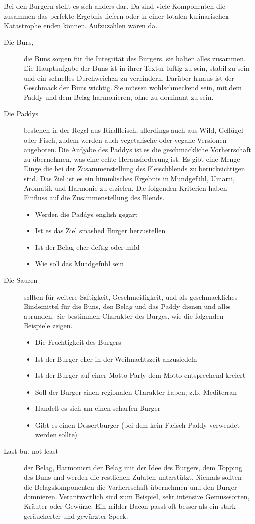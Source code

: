Bei den Burgern stellt es sich anders dar. Da sind viele Komponenten die zusammen das perfekte Ergebnis liefern oder in einer totalen 
kulinarischen Katastrophe enden können.  Aufzuzählen wären da.
\begin{description}
	\item [Die Buns,] die Buns sorgen für die Integrität des Burgers, sie halten alles zusammen. Die Hauptaufgabe der Buns ist in ihrer Textur 
	luftig zu sein, stabil zu sein und ein schnelles Durchweichen zu verhindern. Darüber hinaus ist der Geschmack der Buns wichtig. Sie müssen 
	wohlschmeckend sein, mit dem Paddy und dem Belag harmonieren, ohne zu dominant zu sein.
	\item[Die Paddys] bestehen in der Regel aus Rindfleisch, allerdings auch aus Wild, Geflügel oder Fisch, zudem werden auch vegetarische 
	oder vegane Versionen angeboten. Die Aufgabe des Paddys ist es die geschmackliche Vorherrschaft zu übernehmen, was eine echte 
	Herausforderung ist. Es gibt eine Menge Dinge die bei der Zusammenstellung des Fleischblends zu berücksichtigen sind. Das Ziel ist es ein 
	himmlisches Ergebnis in Mundgefühl, Umami, Aromatik und Harmonie zu erzielen. 
	Die folgenden Kriterien haben Einfluss auf die Zusammenstellung des Blends.
	
		\begin{itemize}[noitemsep]
			\item Werden die Paddys english gegart
			\item Ist es das Ziel smashed Burger herzustellen
			\item Ist der Belag eher deftig oder mild
			\item Wie soll das Mundgefühl sein
		\end{itemize}
	\item [Die Saucen] sollten für weitere Saftigkeit, Geschmeidigkeit, und als geschmackliches Bindemittel für die Buns, den Belag und das 
	Paddy dienen und alles abrunden. Sie bestimmen Charakter des Burges, wie die folgenden Beispiele zeigen.
		\begin{itemize}[noitemsep]
			\item Die Fruchtigkeit des Burgers
			\item Ist der Burger eher in der Weihnachtszeit anzusiedeln
			\item Ist der Burger auf einer Motto-Party dem Motto entsprechend kreiert
			\item Soll der Burger einen regionalen Charakter haben, z.B. Mediterran
			\item Handelt es sich um einen scharfen Burger
			\item Gibt es einen Dessertburger (bei dem kein Fleisch-Paddy verwendet werden sollte)
		\end{itemize}
	\item [Last but not least] der Belag, Harmoniert der Belag mit der Idee des Burgers, dem Topping des Buns und werden die restlichen 
	Zutaten unterstützt. Niemals sollten die Belagskomponenten die Vorherrschaft übernehmen und den Burger domnieren. Verantwortlich 
	sind zum Beispiel, sehr intensive Gemüsesorten, Kräuter oder Gewürze. Ein milder Bacon passt oft besser als ein stark geräucherter und 
	gewürzter Speck.
\end{description}

